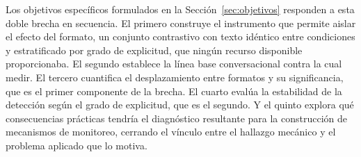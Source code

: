 Los objetivos específicos formulados en la Sección~\ref{sec:objetivos}
responden a esta doble brecha en secuencia. El primero construye el
instrumento que permite aislar el efecto del formato, un conjunto
contrastivo con texto idéntico entre condiciones y estratificado por grado
de explicitud, que ningún recurso disponible proporcionaba. El segundo
establece la línea base conversacional contra la cual medir. El tercero
cuantifica el desplazamiento entre formatos y su significancia, que es el
primer componente de la brecha. El cuarto evalúa la estabilidad de la
detección según el grado de explicitud, que es el segundo. Y el quinto
explora qué consecuencias prácticas tendría el diagnóstico resultante para
la construcción de mecanismos de monitoreo, cerrando el vínculo entre el
hallazgo mecánico y el problema aplicado que lo motiva.
